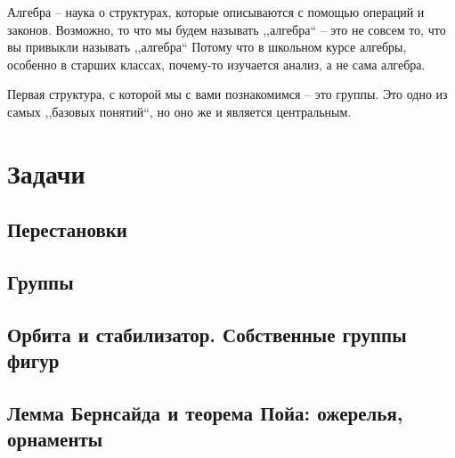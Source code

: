 \documentclass[10pt, twoside]{article}
\begin{document}
\pagestyle{empty}



\newpage

\tableofcontents
\newpage

\setcounter{page}{1}
\pagestyle{fancy}

Алгебра -- наука о структурах, которые описываются с помощью операций и законов. 
Возможно, то что мы будем называть ,,алгебра`` -- это не совсем то, что вы привыкли называть ,,алгебра`` 
Потому что в школьном курсе алгебры, особенно в старших классах, почему-то изучается анализ, а не сама алгебра.

Первая структура, с которой мы с вами познакомимся -- это группы.
Это одно из самых ,,базовых понятий``, но оно же и является центральным. 










\newpage
\renewcommand{\thesubsection}{\roman{subsection}}
\setcounter{subsection}{0}

\section*{Задачи}

\subsection{Перестановки}

\subsection{Группы}

\subsection{Орбита и стабилизатор. Собственные группы фигур}
\subsection{Лемма Бернсайда и теорема Пойа: ожерелья, орнаменты}
% 
\end{document}
